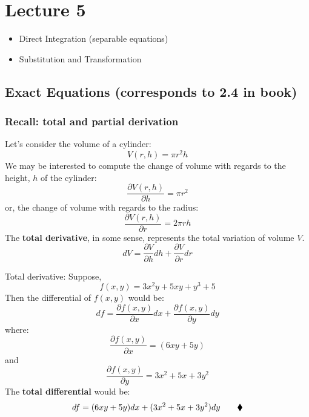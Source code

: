 \chapter*{Lecture 5}
\begin{recall}{}{}
\begin{itemize}
\item Direct Integration (separable equations)
\item Substitution and Transformation
\end{itemize}
\end{recall}



\section{Exact Equations (corresponds to 2.4 in book)} 
\subsection*{Recall: total and partial derivation}
Let's consider the volume of a cylinder:
\begin{equation*}
V(r,h)=\pi r^{2} h
\end{equation*}
We may be interested to compute the change of volume with regards to the height, $h$ of the cylinder:
\begin{equation*}
\frac{\partial V(r,h)}{\partial h}=\pi r^{2}
\end{equation*}
or, the change of volume with regards to the radius:
\begin{equation*}
\frac{\partial V(r,h)}{\partial r}=2\pi rh
\end{equation*}
The \textbf{total derivative}, in some sense, represents the total variation of volume $V$.
\begin{equation*}
dV=\frac{\partial V}{\partial h} dh+\frac{\partial V}{\partial r} dr
\end{equation*}

\begin{exmp}{Total derivative:}
Suppose,
\begin{equation*}
f(x,y)=3x^{2}y+5xy+y^{3}+5
\end{equation*}
Then the differential of $f(x,y)$ would be:
\begin{equation*}
df=\frac{\partial f(x,y)}{\partial x} dx+\frac{\partial f(x,y)}{\partial y} dy
\end{equation*}
where:
\begin{equation*}
\frac{\partial f(x,y)}{\partial x} = (6xy+5y)
\end{equation*}
and
\begin{equation*}
\frac{\partial f(x,y)}{\partial y}=3x^{2}+5x+3y^{2}
\end{equation*}
The \textbf{total differential} would be:
\begin{equation*}
df= (6xy+5y)dx+(3x^{2}+5x+3y^{2})dy \qquad \mathbin{\blacklozenge}
\end{equation*}
\end{exmp}

